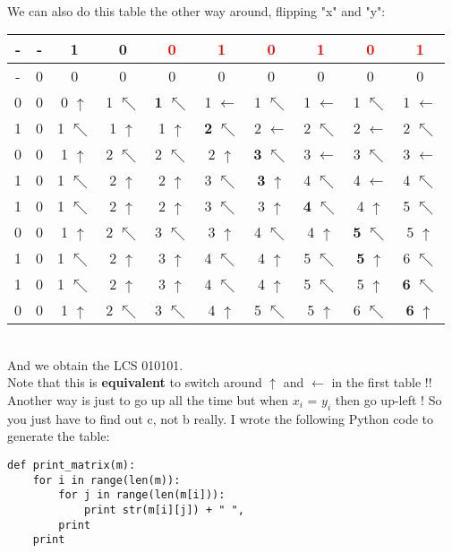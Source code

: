 \documentclass[11pt]{article}
\begin{document}
\begin{enumerate}
    \\ We can also do this table the other way around, flipping "x" and "y": \\
    \begin{tabular}{ c | c c c c c c c c c } 
        - & - & 1 & 0 & \textcolor{red}{0} & \textcolor{red}{1} & \textcolor{red}{0} & \textcolor{red}{1} & \textcolor{red}{0} & \textcolor{red}{1} \\
        \hline
        - & 0 & 0 & 0 & 0 & 0 & 0 & 0 & 0 & 0 \\
        0 & 0 & 0 $\uparrow$ & 1 $\nwarrow$ & \textbf{1} $\nwarrow$ & 1 $\leftarrow$ & 1 $\nwarrow$ & 1 $\leftarrow$ & 1 $\nwarrow$ & 1 $\leftarrow$ \\
        1 & 0 & 1 $\nwarrow$ & 1 $\uparrow$ & 1 $\uparrow$ & \textbf{2} $\nwarrow$ & 2 $\leftarrow$ & 2 $\nwarrow$ & 2 $\leftarrow$ & 2 $\nwarrow$ \\
        0 & 0 & 1 $\uparrow$ & 2 $\nwarrow$ & 2 $\nwarrow$ & 2 $\uparrow$ & \textbf{3} $\nwarrow$ & 3 $\leftarrow$ & 3 $\nwarrow$ & 3 $\leftarrow$ \\
        1 & 0 & 1 $\nwarrow$ & 2 $\uparrow$ & 2 $\uparrow$ & 3 $\nwarrow$ & \textbf{3} $\uparrow$ & 4 $\nwarrow$ & 4 $\leftarrow$ & 4 $\nwarrow$ \\
        1 & 0 & 1 $\nwarrow$ & 2 $\uparrow$ & 2 $\uparrow$ & 3 $\nwarrow$ & 3 $\uparrow$ & \textbf{4} $\nwarrow$ & 4 $\uparrow$ & 5 $\nwarrow$ \\
        0 & 0 & 1 $\uparrow$ & 2 $\nwarrow$ & 3 $\nwarrow$ & 3 $\uparrow$ & 4 $\nwarrow$ & 4 $\uparrow$ & \textbf{5} $\nwarrow$ & 5 $\uparrow$ \\
        1 & 0 & 1 $\nwarrow$ & 2 $\uparrow$ & 3 $\uparrow$ & 4 $\nwarrow$ & 4 $\uparrow$ & 5 $\nwarrow$ & \textbf{5} $\uparrow$ & 6 $\nwarrow$ \\
        1 & 0 & 1 $\nwarrow$ & 2 $\uparrow$ & 3 $\uparrow$ & 4 $\nwarrow$ & 4 $\uparrow$ & 5 $\nwarrow$ & 5 $\uparrow$ & \textbf{6} $\nwarrow$ \\
        0 & 0 & 1 $\uparrow$ & 2 $\nwarrow$ & 3 $\nwarrow$ & 4 $\uparrow$ & 5 $\nwarrow$ & 5 $\uparrow$ & 6 $\nwarrow$ & \textbf{6} $\uparrow$ \\
    \end{tabular}
    \\ And we obtain the LCS 010101. 
    \\ Note that this is \textbf{equivalent} to switch around $\uparrow$ and $\leftarrow$ in the first table !!
    \\ Another way is just to go up all the time but when $x_i$ = $y_i$ then go up-left ! So you just have to find out c, not b really. I wrote the following Python code to generate the table:
    \begin{verbatim}
def print_matrix(m):
    for i in range(len(m)):
        for j in range(len(m[i])):
            print str(m[i][j]) + " ",
        print
    print
    

\end{verbatim}
\end{enumerate}
\end{document}
